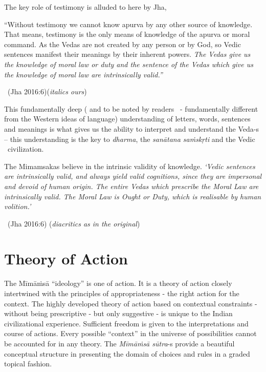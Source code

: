 The key role of testimony is alluded to here by Jha,

\begin{myquote}
“Without testimony we cannot know apurva by any other source of knowledge. That means, testimony is the only means of knowledge of the apurva or moral command. As the Vedas are not created by any person or by God, so Vedic sentences manifest their meanings by their inherent powers. \textit{The Vedas give us the knowledge of moral law or duty and the sentence of the Vedas which give us the knowledge of moral law are intrinsically valid.”}

~\hfill (Jha 2016:6)(\textit{italics ours})
\end{myquote}

This fundamentally deep ( and to be noted by readers  - fundamentally different from the Western ideas of language) understanding of letters, words, sentences and meanings is what gives us the ability to interpret and understand the Veda-s – this understanding is the key to \textit{dharma}, the \textit{sanātana saṁskṛti} and the Vedic  civilization.

\begin{myquote}
The Mimamsakas believe in the intrinsic validity of knowledge. \textit{‘Vedic sentences are intrinsically valid, and always yield valid cognitions, since they are impersonal and devoid of human origin. The entire Vedas which prescribe the Moral Law are intrinsically valid. The Moral Law is Ought or Duty, which is realisable by human volition.’}

\vskip -3pt

~\hfill (Jha 2016:6) (\textit{diacritics as in the original})
\end{myquote}

\vspace{-.3cm}


\section*{Theory of Action}

The Mīmāṁsā “ideology” is one of action. It is a theory of action closely intertwined with the principles of appropriateness - the right action for the context. The highly developed theory of action based on contextual constraints - without being prescriptive - but only suggestive - is unique to the Indian civilizational experience. Sufficient freedom is given to the interpretations and course of actions. Every possible “context” in the universe of possibilities cannot be accounted for in any theory. The \textit{Mīmāṁsā sūtra}-s provide a beautiful conceptual structure in presenting the domain of choices and rules in a graded topical fashion.

